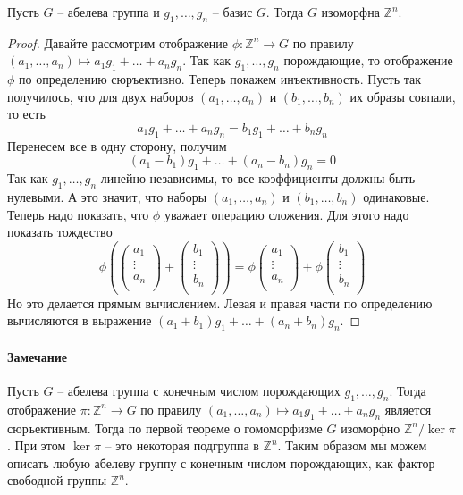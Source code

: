 \begin{claim}
Пусть $G$ -- абелева группа и $g_1,\ldots, g_n$ -- базис $G$.
Тогда $G$ изоморфна $\mathbb Z^{n}$.
\end{claim}
\begin{proof}
Давайте рассмотрим отображение $\phi \colon \mathbb Z^n \to G$ по правилу $(a_1,\ldots,a_n) \mapsto a_1 g_1+ \ldots + a_n g_n$.
Так как $g_1,\ldots, g_n$ порождающие, то отображение $\phi$ по определению сюръективно.
Теперь покажем инъективность.
Пусть так получилось, что для двух наборов $(a_1,\ldots,a_n)$ и $(b_1,\ldots,b_n)$ их образы совпали, то есть
\[
a_1 g_1 + \ldots + a_n g_n = b_1 g_1 + \ldots + b_n g_n
\]
Перенесем все в одну сторону, получим
\[
(a_1 - b_1) g_1 + \ldots + (a_n - b_n) g_n = 0
\]
Так как $g_1,\ldots, g_n$ линейно независимы, то все коэффициенты должны быть нулевыми.
А это значит, что наборы $(a_1,\ldots,a_n)$ и $(b_1,\ldots,b_n)$ одинаковые.
Теперь надо показать, что $\phi$ уважает операцию сложения.
Для этого надо показать тождество
\[
\phi
\left(
\begin{pmatrix}
a_1\\\vdots\\a_n\\
\end{pmatrix}
+
\begin{pmatrix}
b_1\\\vdots\\b_n\\
\end{pmatrix}
\right)
=
\phi
\begin{pmatrix}
a_1\\\vdots\\a_n\\
\end{pmatrix}
+
\phi
\begin{pmatrix}
b_1\\\vdots\\b_n\\
\end{pmatrix}
\]
Но это делается прямым вычислением.
Левая и правая части по определению вычисляются в выражение $(a_1 + b_1) g_1 + \ldots + (a_n + b_n) g_n$.
\end{proof}

\paragraph{Замечание}

Пусть $G$ -- абелева группа с конечным числом порождающих $g_1,\ldots, g_n$.
Тогда отображение $\pi \colon \mathbb Z^n \to G$ по правилу $(a_1,\ldots,a_n) \mapsto a_1 g_1 + \ldots + a_n g_n$ является сюръективным.
Тогда по первой теореме о гомоморфизме $G$ изоморфно $\mathbb Z^n / \ker \pi$.
При этом $\ker \pi$ -- это некоторая подгруппа в $\mathbb Z^n$.
Таким образом мы можем описать любую абелеву группу с конечным числом порождающих, как фактор свободной группы $\mathbb Z^n$.

